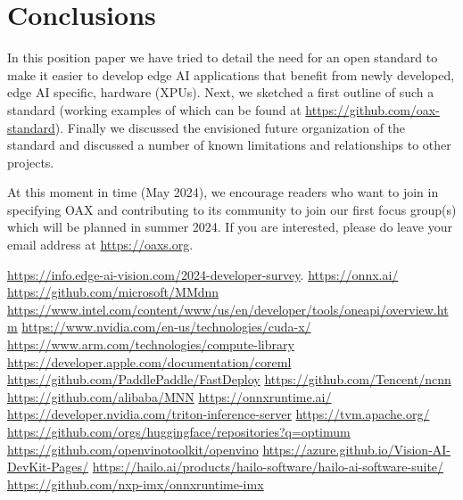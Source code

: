 \documentclass{article}
\newcommand{\oaxweb}{\href{https://oaxs.org}{https://oaxs.org}}
\newcommand{\oaxgit}{\href{https://github.com/oax-standard}{https://github.com/oax-standard}}
\begin{document}
\section{Conclusions}

In this position paper we have tried to detail the need for an open standard to make it easier to develop edge AI applications that benefit from newly developed, edge AI specific, hardware (XPUs). Next, we sketched a first outline of such a standard (working examples of which can be found at \oaxgit). Finally we discussed the envisioned future organization of the standard and discussed a number of known limitations and relationships to other projects.

At this moment in time (May 2024), we encourage readers who want to join in specifying OAX and contributing to its community to join our first focus group(s) which will be planned in summer 2024. If you are interested, please do leave your email address at \oaxweb.

\begin{thebibliography}{9}

	 \href{https://info.edge-ai-vision.com/2024-developer-survey}{https://info.edge-ai-vision.com/2024-developer-survey}.
	 \href{https://onnx.ai/}{https://onnx.ai/}
	\href{https://github.com/microsoft/MMdnn}{https://github.com/microsoft/MMdnn}
	\href{https://www.intel.com/content/www/us/en/developer/tools/oneapi/overview.html}{https://www.intel.com/content/www/us/en/developer/tools/oneapi/overview.htm}
	\href{https://www.nvidia.com/en-us/technologies/cuda-x/}{https://www.nvidia.com/en-us/technologies/cuda-x/}
	\href{https://www.arm.com/technologies/compute-library}{https://www.arm.com/technologies/compute-library}
	\href{https://developer.apple.com/documentation/coreml}{https://developer.apple.com/documentation/coreml}
	\href{https://github.com/PaddlePaddle/FastDeploy}{https://github.com/PaddlePaddle/FastDeploy}
	\href{https://github.com/Tencent/ncnn}{https://github.com/Tencent/ncnn}
	\href{https://github.com/alibaba/MNN}{https://github.com/alibaba/MNN}
	\href{https://onnxruntime.ai/}{https://onnxruntime.ai/}
	\href{https://developer.nvidia.com/triton-inference-server}{https://developer.nvidia.com/triton-inference-server}
	\href{https://tvm.apache.org/}{https://tvm.apache.org/}
	\href{https://github.com/orgs/huggingface/repositories?q=optimum}{https://github.com/orgs/huggingface/repositories?q=optimum}
	\href{https://github.com/openvinotoolkit/openvino}{https://github.com/openvinotoolkit/openvino}
	\href{https://azure.github.io/Vision-AI-DevKit-Pages/}{https://azure.github.io/Vision-AI-DevKit-Pages/}
	\href{https://hailo.ai/products/hailo-software/hailo-ai-software-suite/}{https://hailo.ai/products/hailo-software/hailo-ai-software-suite/}
	\href{https://github.com/nxp-imx/onnxruntime-imx}{https://github.com/nxp-imx/onnxruntime-imx}


\end{thebibliography}
\end{document}
